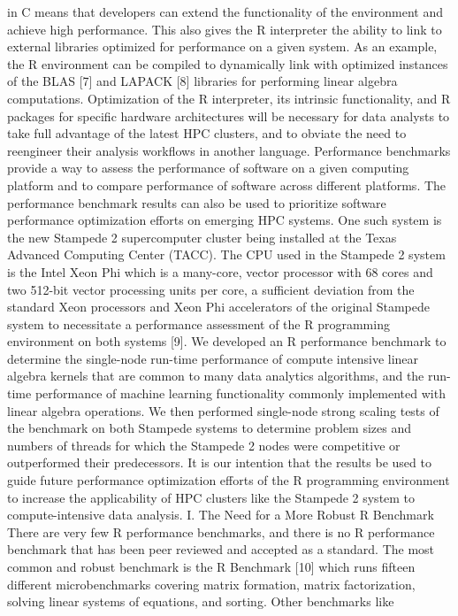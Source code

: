 in C means that developers can extend the functionality of the environment and achieve
high performance.  This also gives the R interpreter the ability to link to external
libraries optimized for performance on a given system.  As an example, the R environment
can be compiled to dynamically link with optimized instances of the BLAS [7] and LAPACK
[8] libraries for performing linear algebra computations.  Optimization of the R
interpreter, its intrinsic functionality, and R packages for specific hardware
architectures will be necessary for data analysts to take full advantage of the latest HPC
clusters, and to obviate the need to reengineer their analysis workflows in another
language. Performance benchmarks provide a way to assess the performance of software on a
given computing platform and to compare performance of software across different
platforms.  The performance benchmark results can also be used to prioritize software
performance optimization efforts on emerging HPC systems.  One such system is the new
Stampede 2 supercomputer cluster being installed at the Texas Advanced Computing Center
(TACC).  The CPU used in the Stampede 2 system is the Intel Xeon Phi which is a many-core,
vector processor with 68 cores and two 512-bit vector processing units per core, a
sufficient deviation from the standard Xeon processors and Xeon Phi accelerators of the
original Stampede system to necessitate a performance assessment of the R programming
environment on both systems [9].  We developed an R performance benchmark to determine the
single-node run-time performance of compute intensive linear algebra kernels that are
common to many data analytics algorithms, and the run-time performance of machine learning
functionality commonly implemented with linear algebra operations.  We then performed
single-node strong scaling tests of the benchmark on both Stampede systems to determine
problem sizes and numbers of threads for which the Stampede 2 nodes were competitive or
outperformed their predecessors.  It is our intention that the results be used to guide
future performance optimization efforts of the R programming environment to increase the
applicability of HPC clusters like the Stampede 2 system to compute-intensive data
analysis. I.	The Need for a More Robust R Benchmark There are very few R performance
benchmarks, and there is no R performance benchmark that has been peer reviewed and
accepted as a standard.  The most common and robust benchmark is the R Benchmark [10]
which runs fifteen different microbenchmarks covering matrix formation, matrix
factorization, solving linear systems of equations, and sorting.  Other benchmarks like
